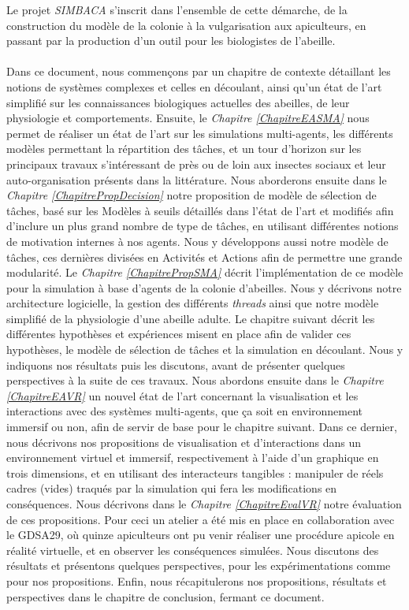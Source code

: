	Le projet \textit{SIMBACA} s'inscrit dans l'ensemble de cette démarche, de la construction du modèle de la colonie à la vulgarisation aux apiculteurs, en passant par la production d'un outil pour les biologistes de l'abeille.
	
	\paragraph{}
	Dans ce document, nous commençons par un chapitre de contexte détaillant les notions de systèmes complexes et celles en découlant, ainsi qu'un état de l'art simplifié sur les connaissances biologiques actuelles des abeilles, de leur physiologie et comportements.
	 Ensuite, le \textit{Chapitre \ref{ChapitreEASMA}} nous permet de réaliser un état de l'art sur les simulations multi-agents, les différents modèles permettant la répartition des tâches, et un tour d'horizon sur les principaux travaux s'intéressant de près ou de loin aux insectes sociaux et leur auto-organisation présents dans la littérature. 
	 Nous aborderons ensuite dans le \textit{Chapitre \ref{ChapitrePropDecision}} notre proposition de modèle de sélection de tâches, basé sur les Modèles à seuils détaillés dans l'état de l'art et modifiés afin d'inclure un plus grand nombre de type de tâches, en utilisant différentes notions de motivation internes à nos agents. Nous y développons aussi notre modèle de tâches, ces dernières divisées en Activités et Actions afin de permettre une grande modularité. 
	 Le \textit{Chapitre \ref{ChapitrePropSMA}} décrit l'implémentation de ce modèle pour la simulation à base d'agents de la colonie d'abeilles. Nous y décrivons notre architecture logicielle, la gestion des différents \textit{threads} ainsi que notre modèle simplifié de la physiologie d'une abeille adulte. 
	 Le chapitre suivant décrit les différentes hypothèses et expériences misent en place afin de valider ces hypothèses, le modèle de sélection de tâches et la simulation en découlant. Nous y indiquons nos résultats puis les discutons, avant de présenter quelques perspectives à la suite de ces travaux. 
	 Nous abordons ensuite dans le \textit{Chapitre \ref{ChapitreEAVR}} un nouvel état de l'art concernant la visualisation et les interactions avec des systèmes multi-agents, que ça soit en environnement immersif ou non, afin de servir de base pour le chapitre suivant. 
	 Dans ce dernier, nous décrivons nos propositions de visualisation et d'interactions dans un environnement virtuel et immersif, respectivement à l'aide d'un graphique en trois dimensions, et en utilisant des interacteurs tangibles : manipuler de réels cadres (vides) traqués par la simulation qui fera les modifications en conséquences. 
	 Nous décrivons dans le \textit{Chapitre \ref{ChapitreEvalVR}} notre évaluation de ces propositions. Pour ceci un atelier a été mis en place en collaboration avec le GDSA29, où quinze apiculteurs ont pu venir réaliser une procédure apicole en réalité virtuelle, et en observer les conséquences simulées. Nous discutons des résultats et présentons quelques perspectives, pour les expérimentations comme pour nos propositions. 
	 Enfin, nous récapitulerons nos propositions, résultats et perspectives dans le chapitre de conclusion, fermant ce document.